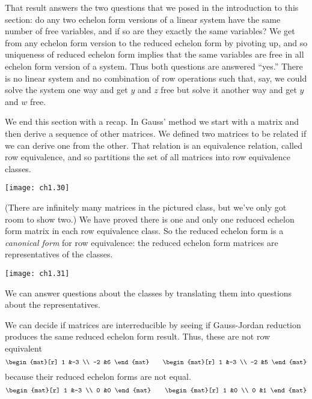 That result answers the two questions that we posed in the introduction
to this section: do any two echelon form versions of a linear system 
have the same number of free variables, and if so are they
exactly the same variables?
We get from any echelon form version to the reduced echelon form by pivoting up,
and so uniqueness of reduced echelon form implies that the same variables 
are free in all echelon form version of a system.
Thus both questions are answered ``yes.''
There is no linear system and no combination of row operations such
that, say, we could solve the system 
one way and get $y$ and $z$ free but solve it
another way and get $y$ and $w$ free.

We end this section with a recap.
In Gauss' method we start with a matrix and then
derive a sequence of other matrices.
We defined two matrices to be related if we can derive one from the other.
That relation is an equivalence relation, %
called row equivalence, and
so partitions the set of all matrices into row equivalence classes.
\begin{center}
  \texttt{[image: ch1.30]}
\end{center}
(There are infinitely many matrices in the pictured class, but we've only
got room to show two.)
We have proved there is one and only one reduced echelon form matrix in
each row equivalence class.
So the reduced echelon form is a
{\em canonical form}%
%
%
for row equivalence:
the reduced echelon form matrices are
representatives of the classes.
\begin{center}
  \texttt{[image: ch1.31]}
\end{center}
We can answer questions about the classes by translating them
into questions about the representatives.

\begin{example}  \label{ex:MatsNotRowEq}
We can decide if matrices are interreducible
by seeing if Gauss-Jordan reduction produces the same
reduced echelon form result.
Thus, these are not row equivalent
\begin{equation*}
  \begin{mat}[r]
    1  &-3  \\
   -2  &6
  \end{mat}
  \qquad
  \begin{mat}[r]
    1  &-3  \\
   -2  &5
  \end{mat}
\end{equation*}
because their reduced echelon forms are not equal.
\begin{equation*}
  \begin{mat}[r]
    1  &-3  \\
    0  &0
  \end{mat}
  \qquad
  \begin{mat}[r]
    1  &0   \\
    0  &1
  \end{mat}
\end{equation*}
\end{example}

